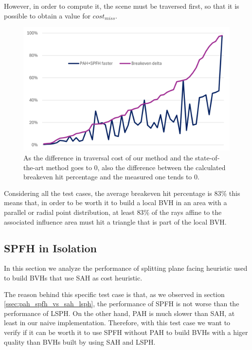 \documentclass{PoliMi_MasterThesis}
\begin{document}
However, in order to compute it, the scene must be traversed first, so that it is possible to obtain a value for $cost_{miss}$.

\begin{figure}[H] 
	\includegraphics[width=\textwidth]{Images/breakeven_hit_perc_accuracy.png}
	\caption{As the difference in traversal cost of our method and the state-of-the-art method goes to 0, also the difference between the calculated breakeven hit percentage and the measured one tends to 0.}
	\label{fig:breakeven_hit_perc_accuracy}
\end{figure}

Considering all the test cases, the average breakeven hit percentage is $83\%$ this means that, in order to be worth it to build a local BVH in an area with a parallel or radial point distribution, at least $83\%$ of the rays affine to the associated influence area must hit a triangle that is part of the local BVH.

\subsection{SPFH in Isolation} \label{ssec:spfh_in_isolation}
In this section we analyze the performance of splitting plane facing heuristic used to build BVHs that use SAH as cost heuristic.

The reason behind this specific test case is that, as we observed in section \ref{ssec:pah_spfh_vs_sah_lsph}, the performance of SPFH is not worse than the performance of LSPH. On the other hand, PAH is much slower than SAH, at least in our naive implementation. Therefore, with this test case we want to verify if it can be worth it to use SPFH without PAH to build BVHs with a higer quality than BVHs built by using SAH and LSPH.
\end{document}
